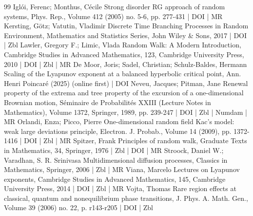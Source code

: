 \documentclass[10pt]{amsart}
\theoremstyle{definition}\newtheorem{defi}[theo]{Definition}\newtheorem{rema}[theo]{Remark}\newtheorem{exam}[theo]{Example}\newtheorem{exem}[theo]{Example}\newtheorem{nota}[theo]{Notation}
\begin{document}
\begin{thebibliography}{99}
 Iglói, Ferenc; Monthus, Cécile Strong disorder RG approach of random systems, Phys. Rep., Volume 412 (2005) no. 5-6, pp. 277-431 | DOI | MR
 Kersting, Götz; Vatutin, Vladimir Discrete Time Branching Processes in Random Environment, Mathematics and Statistics Series, John Wiley \& Sons, 2017 | DOI | Zbl
 Lawler, Gregory F.; Limic, Vlada Random Walk: A Modern Introduction, Cambridge Studies in Advanced Mathematics, 123, Cambridge University Press, 2010 | DOI | Zbl | MR
 De Moor, Joris; Sadel, Christian; Schulz-Baldes, Hermann Scaling of the Lyapunov exponent at a balanced hyperbolic critical point, Ann. Henri Poincaré (2025) (online first) | DOI
 Neveu, Jacques; Pitman, Jane Renewal property of the extrema and tree property of the excursion of a one-dimensional Brownian motion, Séminaire de Probabilités XXIII (Lecture Notes in Mathematics), Volume 1372, Springer, 1989, pp. 239-247 | DOI | Zbl | Numdam | MR
 Orlandi, Enza; Picco, Pierre One-dimensional random field Kac’s model: weak large deviations principle, Electron. J. Probab., Volume 14 (2009), pp. 1372-1416 | DOI | Zbl | MR
 Spitzer, Frank Principles of random walk, Graduate Texts in Mathematics, 34, Springer, 1976 | Zbl | DOI | MR
 Stroock, Daniel W.; Varadhan, S. R. Srinivasa Multidimensional diffusion processes, Classics in Mathematics, Springer, 2006 | Zbl | MR
 Viana, Marcelo Lectures on Lyapunov exponents, Cambridge Studies in Advanced Mathematics, 145, Cambridge University Press, 2014 | DOI | Zbl | MR
 Vojta, Thomas Rare region effects at classical, quantum and nonequilibrium phase transitions, J. Phys. A. Math. Gen., Volume 39 (2006) no. 22, p. r143-r205 | DOI | Zbl
\end{thebibliography}
\end{document}
